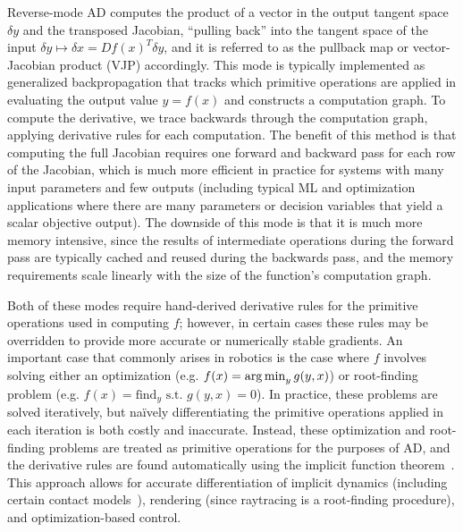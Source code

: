 Reverse-mode AD computes the product of a vector in the output tangent space $\delta y$ and the transposed Jacobian, ``pulling back'' into the tangent space of the input $\delta y \mapsto \delta x = Df(x)^T \delta y$, and it is referred to as the pullback map or vector-Jacobian product (VJP) accordingly. This mode is typically implemented as generalized backpropagation that tracks which primitive operations are applied in evaluating the output value $y = f(x)$ and constructs a computation graph. To compute the derivative, we trace backwards through the computation graph, applying derivative rules for each computation. The benefit of this method is that computing the full Jacobian requires one forward and backward pass for each row of the Jacobian, which is much more efficient in practice for systems with many input parameters and few outputs (including typical ML and optimization applications where there are many parameters or decision variables that yield a scalar objective output). The downside of this mode is that it is much more memory intensive, since the results of intermediate operations during the forward pass are typically cached and reused during the backwards pass, and the memory requirements scale linearly with the size of the function's computation graph.

Both of these modes require hand-derived derivative rules for the primitive operations used in computing $f$; however, in certain cases these rules may be overridden to provide more accurate or numerically stable gradients. An important case that commonly arises in robotics is the case where $f$ involves solving either an optimization (e.g. $f(x) = \operatorname*{arg\,min}_y g(y, x)$) or root-finding problem (e.g. $f(x) = \text{find}_y \text{ s.t. } g(y, x) = 0$). In practice, these problems are solved iteratively, but na\"ively differentiating the primitive operations applied in each iteration is both costly and inaccurate. Instead, these optimization and root-finding problems are treated as primitive operations for the purposes of AD, and the derivative rules are found automatically using the implicit function theorem~\cite{agrawalDifferentiableConvexOptimization2019}. This approach allows for accurate differentiation of implicit dynamics (including certain contact models~\cite{howelllecleach2022}), rendering (since raytracing is a root-finding procedure), and optimization-based control.

